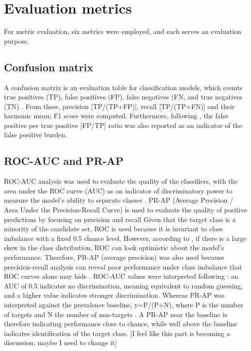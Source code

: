 \documentclass[ %
                    author={Daniel Page},
                supervisor={Dr. Andrew Calway},
                    degree={MSc},
                     title={Some Structural Guidelines for Data Science MSc Theses, Including Those With Long Titles that Run Across Multiple Lines on the Front Page},
                  subtitle={And those including an optional subtitle too, for good measure},
                      type={},
                      year={2021}]{dissertation}
\begin{document}
\section{Evaluation metrics}
For metric evaluation, six metrics were employed, and each serves an evaluation purpose.
\subsection{Confusion matrix}
A confusion matrix is an evaluation table for classification models, which counts true positives (TP), false positives (FP), false negatives (FN, and true negatives (TN) \cite{singh_diagnosing_2021}. From these, precision [TP/(TP+FP)], recall [TP/(TP+FN)] and their harmonic mean; F1 score were computed. Furthermore, following \cite{troglio_hybrid_2026}, the false positive per true positive [FP/TP] ratio was also reported as an indicator of the false positive burden. 
\subsection{ROC-AUC and PR-AP}
ROC-AUC analysis was used to evaluate the quality of the classifiers, with the area under the ROC curve (AUC) as an indicator of discriminatory power to measure the model's ability to separate classes \cite{hanley_meaning_1982}. PR-AP (Average Precision / Area Under the Precision-Recall Curve) is used to evaluate the quality of positive predictions by focusing on precision and recall 
Given that the target class is a minority of the candidate set, ROC is used because it is invariant to class imbalance with a fixed 0.5 chance level. However, according to \cite{krzhizhanovskaya_model_2020, davis_relationship_2006}, if there is a large skew in the class distribution, ROC can look optimistic about the model's performance. Therefore, PR-AP (average precision) was also used because precision-recall analysis can reveal poor performance under class imbalance that ROC curves alone may hide \cite{krzhizhanovskaya_model_2020}. 
ROC-AUC values were interpreted following \cite{hosmer_applied_2013}: an AUC of 0.5 indicates no discrimination, meaning equivalent to random guessing, and a higher value indicates stronger discrimination. Whereas PR-AP was interpreted against the prevalence baseline, y=P/(P+N), where P is the number of targets and N the number of non-targets \cite{saito_precision-recall_2015}. A PR-AP near the baseline is therefore indicating performance close to chance, while well above the baseline indicates identification of the target class. 
[I feel like this part is becoming a discussion; maybe I need to change it]
\end{document}

